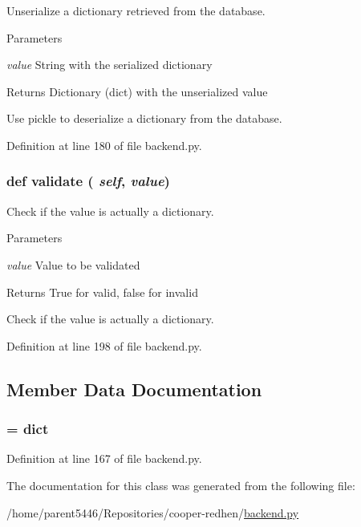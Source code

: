 Unserialize a dictionary retrieved from the database. 


\begin{DoxyParams}{Parameters}
\item[{\em value}]String with the serialized dictionary \end{DoxyParams}
\begin{DoxyReturn}{Returns}
Dictionary (dict) with the unserialized value\begin{DoxyVerb}Use pickle to deserialize a dictionary from the database.\end{DoxyVerb}
 
\end{DoxyReturn}


Definition at line 180 of file backend.py.

\hypertarget{classbackend_1_1_dict_property_a8f3dc5c8aaf85c281c2f52cda259aa56}{
\subsubsection[{validate}]{\setlength{\rightskip}{0pt plus 5cm}def validate ( {\em self}, \/   {\em value})}}
\label{classbackend_1_1_dict_property_a8f3dc5c8aaf85c281c2f52cda259aa56}


Check if the value is actually a dictionary. 


\begin{DoxyParams}{Parameters}
\item[{\em value}]Value to be validated \end{DoxyParams}
\begin{DoxyReturn}{Returns}
True for valid, false for invalid\begin{DoxyVerb}Check if the value is actually a dictionary.\end{DoxyVerb}
 
\end{DoxyReturn}


Definition at line 198 of file backend.py.



\subsection{Member Data Documentation}
\hypertarget{classbackend_1_1_dict_property_ac2ad7f431e3446fddcd9b6b9f93c4c14}{
\subsubsection[{data\_\-type}]{ = dict}}
\label{classbackend_1_1_dict_property_ac2ad7f431e3446fddcd9b6b9f93c4c14}


Definition at line 167 of file backend.py.



The documentation for this class was generated from the following file:\begin{DoxyCompactItemize}
\item 
/home/parent5446/Repositories/cooper-\/redhen/\hyperlink{backend_8py}{backend.py}\end{DoxyCompactItemize}
